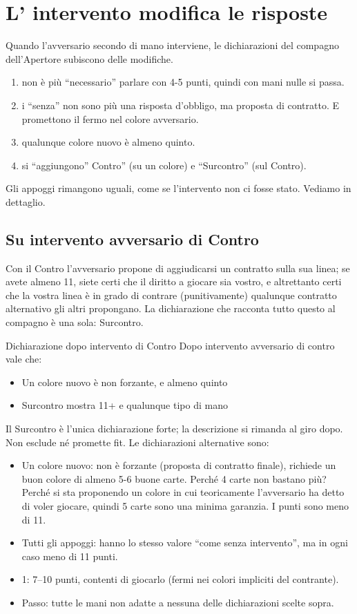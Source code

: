 \documentclass[../corsofiori.tex]{subfiles}
\begin{document}
\section{L’ intervento modifica le risposte}
Quando l’avversario secondo di mano interviene, le dichiarazioni del compagno
dell’Apertore subiscono delle modifiche.
\begin{enumerate}
\item non è più “necessario” parlare con 4-5 punti, quindi con mani nulle si passa.
\item i “senza” non sono più una risposta d’obbligo, ma proposta di contratto. E promettono il fermo nel colore avversario.
\item qualunque colore nuovo è almeno quinto.
\item si “aggiungono” Contro” (su un colore) e “Surcontro” (sul Contro).
\end{enumerate}

Gli appoggi rimangono uguali, come se l’intervento non ci fosse stato. Vediamo in
dettaglio.

\subsection{Su intervento avversario di Contro}
Con il Contro l’avversario propone di aggiudicarsi un contratto sulla sua linea; se
avete almeno 11, siete certi che il diritto a giocare sia vostro, e altrettanto certi che
la vostra linea è in grado di contrare (punitivamente) qualunque contratto alternativo
gli altri propongano. La dichiarazione che racconta tutto questo al compagno è una
sola: Surcontro.

\begin{regola}{Dichiarazione dopo intervento di Contro}
Dopo intervento avversario di contro vale che:
\begin{itemize}
\item Un colore nuovo è non forzante, e almeno quinto
\item Surcontro mostra 11+ e qualunque tipo di mano
\end{itemize}
\end{regola}

Il Surcontro è l’unica dichiarazione forte; la descrizione si rimanda al giro dopo.
Non esclude né promette fit. Le dichiarazioni alternative sono:
\begin{itemize}
\item Un colore nuovo: non è forzante (proposta di contratto finale), richiede un buon colore di almeno 5-6 buone carte.
    Perché 4 carte non bastano più? Perché si sta proponendo un colore in cui teoricamente l’avversario ha detto di
    voler giocare, quindi 5 carte sono una minima garanzia. I punti sono meno di 11.
\item Tutti gli appoggi: hanno lo
    stesso valore “come senza intervento”, ma in ogni caso meno di 11 punti.
\item 1\SA: 7--10 punti, contenti di giocarlo (fermi nei colori impliciti del contrante).
    \item Passo: tutte le mani non adatte a nessuna delle dichiarazioni scelte sopra.
\end{itemize}
\end{document}

